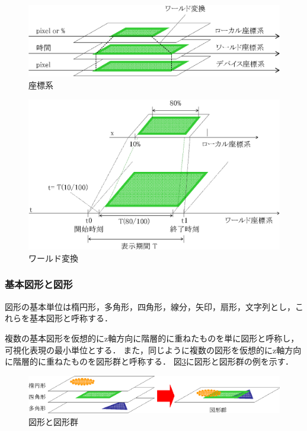 \begin{figure}[p]
\begin{center}
\includegraphics[scale=0.75]{img/coordinate.eps}
\caption{座標系}
\label{fig:coordinate}
\end{center}
\end{figure}

\begin{figure}[p]
\begin{center}
\includegraphics[scale=0.75]{img/worldTransform.eps}
\caption{ワールド変換}
\label{fig:worldTransform}
\end{center}
\end{figure}

\subsubsection{基本図形と図形}
図形の基本単位は楕円形，多角形，四角形，線分，矢印，扇形，文字列とし，これらを基本図形と呼称する．

複数の基本図形を仮想的にz軸方向に階層的に重ねたものを単に図形と呼称し，可視化表現の最小単位とする．
また，同じように複数の図形を仮想的にz軸方向に階層的に重ねたものを図形群と呼称する．
図\ref{fig:shapes}に図形と図形群の例を示す．

\begin{figure}[p]
\begin{center}
\includegraphics[scale=0.75]{img/shapes.eps}
\caption{図形と図形群}
\label{fig:shapes}
\end{center}
\end{figure}

